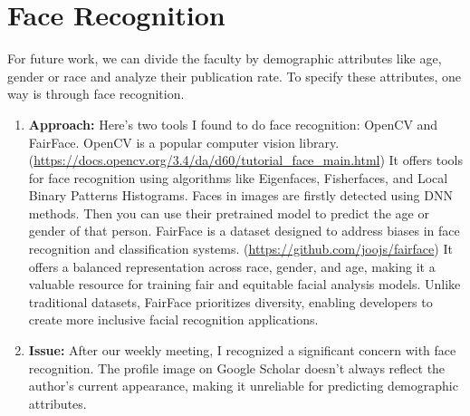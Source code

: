 \documentclass[../report.tex]{subfiles}
\begin{document}
\section{Face Recognition}
\hspace{0.5cm} For future work, we can divide the faculty by demographic attributes like age, gender or race and analyze their publication rate. To specify these attributes, one way is through face recognition. 

\begin{enumerate}
    \item \textbf{Approach: } Here's two tools I found to do face recognition: OpenCV and FairFace. OpenCV is a popular computer vision library. (\url{https://docs.opencv.org/3.4/da/d60/tutorial_face_main.html}) It offers tools for face recognition using algorithms like Eigenfaces, Fisherfaces, and Local Binary Patterns Histograms. Faces in images are firstly detected using DNN methods. Then you can use their pretrained model to predict the age or gender of that person. FairFace is a dataset designed to address biases in face recognition and classification systems. (\url{https://github.com/joojs/fairface}) It offers a balanced representation across race, gender, and age, making it a valuable resource for training fair and equitable facial analysis models. Unlike traditional datasets, FairFace prioritizes diversity, enabling developers to create more inclusive facial recognition applications.
    \item \textbf{Issue: } After our weekly meeting, I recognized a significant concern with face recognition. The profile image on Google Scholar doesn't always reflect the author's current appearance, making it unreliable for predicting demographic attributes.
\end{enumerate}
\end{document}
